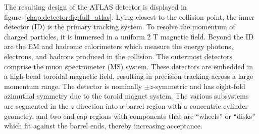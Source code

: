 The resulting design of the ATLAS detector is displayed in
figure~\ref{chap:detector:fig:full_atlas}. Lying closest to the
collision point, the inner detector (ID) is the primary tracking
system. To resolve the momentum of charged particles, it is immersed
in a uniform 2 T magnetic field. Beyond the ID are the EM and hadronic
calorimeters which measure the energy photons, electrons, and hadrons
produced in the collision. The outermost detectors comprise the muon
spectrometer (MS) system. These detectors are embedded in a high-bend
toroidal magnetic field, resulting in precision tracking across a
large momentum range. The detector is nominally $\pm z$-symmetric and
has eight-fold azimuthal symmetry due to the toroid magnet system. The
various subsystems are segmented in the $z$ direction into a barrel
region with a concentric cylinder geometry, and two end-cap regions
with components that are ``wheels'' or ``disks'' which fit against the
barrel ends, thereby increasing acceptance. 
